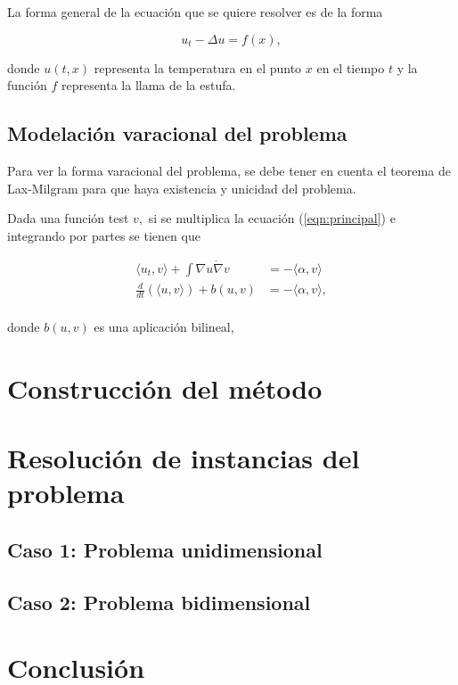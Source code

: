 \documentclass[12pt,paperletter]{article}
\begin{document}
La forma general de la ecuación que se quiere resolver es de la forma 

\begin{equation}
\label{eqn:principal}
u_t - \Delta u = f(x),
\end{equation}
  
donde $u(t,x)$ representa la temperatura en el punto $x$ en el tiempo $t$ y la función $f$ representa la llama de la estufa.   





\subsection{Modelación varacional del problema}
Para ver la forma varacional del problema, se debe tener en cuenta el teorema de Lax-Milgram para que haya existencia y unicidad del problema.

Dada una función test $v, $ si se multiplica la ecuación (\ref{eqn:principal}) e integrando por partes se tienen que 

\begin{align*}
    \langle u_t, v \rangle + \int \nabla u \dot \nabla v   &= - \langle \alpha , v \rangle \\
    \frac{d}{dt} (\langle u, v \rangle)+ b(u,v)&=-\langle \alpha , v \rangle, \\
\end{align*}

donde $b(u,v)$ es una aplicación bilineal, 

\section{Construcción del método}

\newpage
\section{Resolución de instancias del problema}

\subsection{Caso 1: Problema unidimensional }


\subsection{Caso 2: Problema bidimensional}




\newpage
\section{Conclusión}
\end{document}
